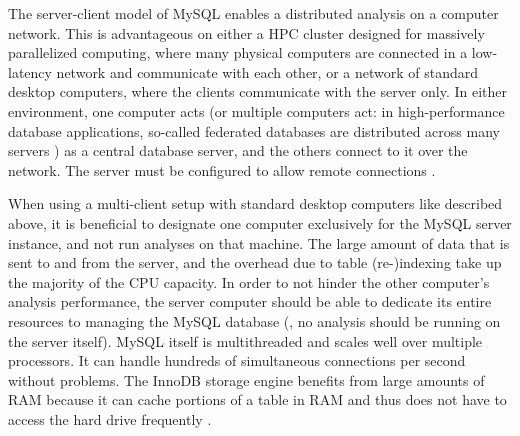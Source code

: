 The server-client model of MySQL enables a distributed analysis on a computer
network. This is advantageous on either a HPC cluster designed for massively
parallelized computing, where many physical computers are connected in a
low-latency network and communicate with each other, or a network of standard
desktop computers, where the clients communicate with the server only. In either
environment, one computer acts (or multiple computers act: in high-performance
database applications, so-called federated databases are distributed across many
servers \citep{schwartz2012}) as a central database server, and the others
connect to it over the network. The server must be configured to allow remote
connections \citep{mysql2013}.



When using a multi-client setup with standard desktop computers like described
above, it is beneficial to designate one computer exclusively for the MySQL
server instance, and not run \pname analyses on that machine. The large amount
of data that is sent to and from the server, and the overhead due to table
(re-)indexing take up the majority of the CPU capacity. In order to not hinder
the other computer's analysis performance, the server computer should be able to
dedicate its entire resources to managing the MySQL database (\ie, no \pname
analysis should be running on the server itself). MySQL itself is multithreaded
and scales well over multiple processors. It can handle hundreds of simultaneous
connections per second without problems. The InnoDB storage engine benefits from
large amounts of RAM because it can cache portions of a table in RAM and thus
does not have to access the hard drive frequently \citep{schneider2005}.
